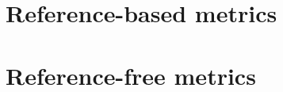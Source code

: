 
\lipsum[5]

\section{Reference-based metrics}

\lipsum[5]

\section{Reference-free metrics}

\lipsum[5]

